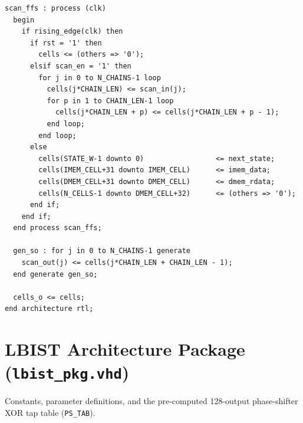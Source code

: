 \documentclass[conference]{IEEEtran}
\begin{document}
\begin{lstlisting}[style=vhdlstyle, caption={Scan-Inserted MIPS32 Core (\texttt{mips\_scan\_core.vhd})}]
  scan_ffs : process (clk)
  begin
    if rising_edge(clk) then
      if rst = '1' then
        cells <= (others => '0');
      elsif scan_en = '1' then
        for j in 0 to N_CHAINS-1 loop
          cells(j*CHAIN_LEN) <= scan_in(j);
          for p in 1 to CHAIN_LEN-1 loop
            cells(j*CHAIN_LEN + p) <= cells(j*CHAIN_LEN + p - 1);
          end loop;
        end loop;
      else
        cells(STATE_W-1 downto 0)                 <= next_state;
        cells(IMEM_CELL+31 downto IMEM_CELL)      <= imem_data;
        cells(DMEM_CELL+31 downto DMEM_CELL)      <= dmem_rdata;
        cells(N_CELLS-1 downto DMEM_CELL+32)      <= (others => '0');
      end if;
    end if;
  end process scan_ffs;

  gen_so : for j in 0 to N_CHAINS-1 generate
    scan_out(j) <= cells(j*CHAIN_LEN + CHAIN_LEN - 1);
  end generate gen_so;

  cells_o <= cells;
end architecture rtl;
\end{lstlisting}

\section{LBIST Architecture Package (\texttt{lbist\_pkg.vhd})}
\label{app:lbist_pkg}
Constants, parameter definitions, and the pre-computed 128-output phase-shifter XOR tap table (\texttt{PS\_TAB}).
\end{document}
